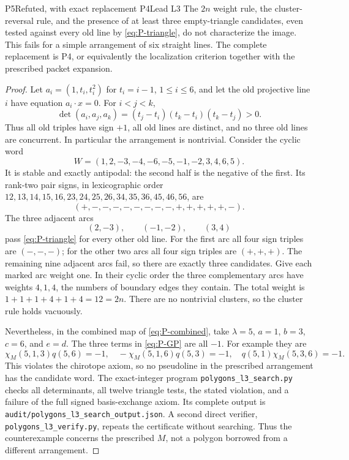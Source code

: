 \begin{resultenv}{P5}{Refuted, with exact replacement P4}{Lead L3}
The $2n$ weight rule, the cluster-reversal rule, and the presence of at
least three empty-triangle candidates, even tested against every old
line by \eqref{eq:P-triangle}, do not characterize the image.  This
fails for a simple arrangement of six straight lines.  The complete
replacement is P4, or equivalently the localization criterion together
with the prescribed packet expansion.
\end{resultenv}

\begin{proof}
Let $a_i=(1,t_i,t_i^2)$ for $t_i=i-1$, $1\le i\le6$, and let the old
projective line $i$ have equation $a_i\cdot x=0$.  For $i<j<k$,
\[
 \det(a_i,a_j,a_k)=(t_j-t_i)(t_k-t_i)(t_k-t_j)>0.
\]
Thus all old triples have sign $+1$, all old lines are distinct, and
no three old lines are concurrent.  In particular the arrangement is
nontrivial.  Consider the cyclic word
\[
 W=(1,2,-3,-4,-6,-5,-1,-2,3,4,6,5).
\]
It is stable and exactly antipodal: the second half is the negative of
the first.  Its rank-two pair signs, in lexicographic order
$12,13,14,15,16,23,24,25,26,34,35,36,45,46,56$, are
\[
 (+,-,-,-,-,-,-,-,-,+,+,+,+,+,-).
\]
The three adjacent arcs
\[
                (2,-3),\qquad(-1,-2),\qquad(3,4)
\]
pass \eqref{eq:P-triangle} for every other old line.  For the first
arc all four sign triples are $(-,-,-)$; for the other two arcs all
four sign triples are $(+,+,+)$.  The remaining nine adjacent arcs
fail, so there are exactly three candidates.  Give each marked arc
weight one.  In their cyclic order the three complementary arcs have
weights $4,1,4$, the numbers of boundary edges they contain.  The
total weight is $1+1+1+4+1+4=12=2n$.  There are no nontrivial clusters,
so the cluster rule holds vacuously.

Nevertheless, in the combined map of \eqref{eq:P-combined}, take
$\lambda=5$, $a=1$, $b=3$, $c=6$, and $e=d$.  The three terms in
\eqref{eq:P-GP} are all $-1$.  For example they are
\[
 \chi_M(5,1,3)q(5,6)=-1,\quad
 -\chi_M(5,1,6)q(5,3)=-1,\quad
 q(5,1)\chi_M(5,3,6)=-1.
\]
This violates the chirotope axiom, so no pseudoline in the prescribed
arrangement has the candidate word.  The exact-integer program
\texttt{polygons\_l3\_search.py} checks all determinants, all twelve
triangle tests, the stated violation, and a failure of the full signed
basis-exchange axiom.  Its complete output is
\texttt{audit/polygons\_l3\_search\_output.json}.  A second direct
verifier, \texttt{polygons\_l3\_verify.py}, repeats the certificate
without searching.  Thus the counterexample concerns the prescribed
$M$, not a polygon borrowed from a different arrangement.
\end{proof}

